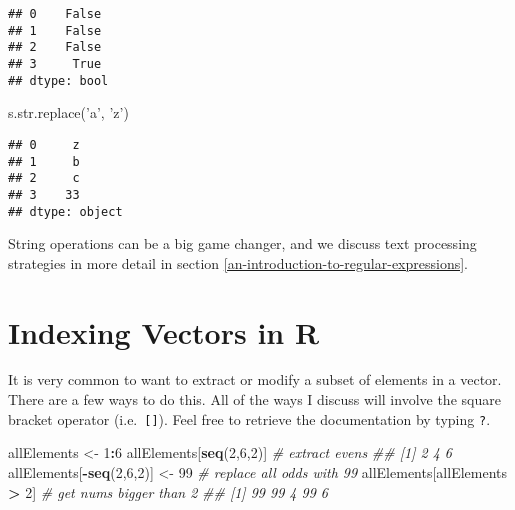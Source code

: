 \documentclass[12pt,krantz2]{krantz}
\makeatletter
\newenvironment{Shaded}{\begin{snugshade}}{\end{snugshade}}
\newcommand{\BuiltInTok}[1]{#1}
\newcommand{\CommentTok}[1]{\textcolor[rgb]{0.37,0.37,0.37}{\textit{#1}}}
\newcommand{\DecValTok}[1]{\textcolor[rgb]{0.06,0.06,0.06}{#1}}
\newcommand{\KeywordTok}[1]{\textcolor[rgb]{0.27,0.27,0.27}{\textbf{#1}}}
\newcommand{\NormalTok}[1]{#1}
\newcommand{\OperatorTok}[1]{\textcolor[rgb]{0.43,0.43,0.43}{\textbf{#1}}}
\newcommand{\StringTok}[1]{\textcolor[rgb]{0.5,0.5,0.5}{#1}}
\newenvironment{kframe}{%
\medskip{}
\setlength{\fboxsep}{.8em}
 \def\at@end@of@kframe{}%
 \ifinner\ifhmode%
  \def\at@end@of@kframe{\end{minipage}}%
  \begin{minipage}{\columnwidth}%
 \fi\fi%
 \def\FrameCommand##1{\hskip\@totalleftmargin \hskip-\fboxsep
 \colorbox{shadecolor}{##1}\hskip-\fboxsep
     \hskip-\linewidth \hskip-\@totalleftmargin \hskip\columnwidth}%
 \MakeFramed {\advance\hsize-\width
   \@totalleftmargin\z@ \linewidth\hsize
   \@setminipage}}%
 {\par\unskip\endMakeFramed%
 \at@end@of@kframe}
\renewenvironment{Shaded}{\begin{kframe}}{\end{kframe}}
\makeatother
\begin{document}
\begin{verbatim}
## 0    False
## 1    False
## 2    False
## 3     True
## dtype: bool
\end{verbatim}

\begin{Shaded}
\begin{Highlighting}[]
\NormalTok{s.}\BuiltInTok{str}\NormalTok{.replace(}\StringTok{'a'}\NormalTok{, }\StringTok{'z'}\NormalTok{)}
\end{Highlighting}
\end{Shaded}

\begin{verbatim}
## 0     z
## 1     b
## 2     c
## 3    33
## dtype: object
\end{verbatim}

String operations can be a big game changer, and we discuss text processing strategies in more detail in section \ref{an-introduction-to-regular-expressions}.

\hypertarget{indexing-vectors-in-r}{%
\section{Indexing Vectors in R}\label{indexing-vectors-in-r}}

It is very common to want to extract or modify a subset of elements in a vector. There are a few ways to do this. All of the ways I discuss will involve the square bracket operator (i.e.~\texttt{{[}{]}}). Feel free to retrieve the documentation by typing \texttt{?\textquotesingle{}{[}\textquotesingle{}}.

\begin{Shaded}
\begin{Highlighting}[]
\NormalTok{allElements <-}\StringTok{ }\DecValTok{1}\OperatorTok{:}\DecValTok{6}
\NormalTok{allElements[}\KeywordTok{seq}\NormalTok{(}\DecValTok{2}\NormalTok{,}\DecValTok{6}\NormalTok{,}\DecValTok{2}\NormalTok{)] }\CommentTok{# extract evens}
\CommentTok{## [1] 2 4 6}
\NormalTok{allElements[}\OperatorTok{-}\KeywordTok{seq}\NormalTok{(}\DecValTok{2}\NormalTok{,}\DecValTok{6}\NormalTok{,}\DecValTok{2}\NormalTok{)] <-}\StringTok{ }\DecValTok{99} \CommentTok{# replace all odds with 99}
\NormalTok{allElements[allElements }\OperatorTok{>}\StringTok{ }\DecValTok{2}\NormalTok{] }\CommentTok{# get nums bigger than 2}
\CommentTok{## [1] 99 99  4 99  6}
\end{Highlighting}
\end{Shaded}
\end{document}
